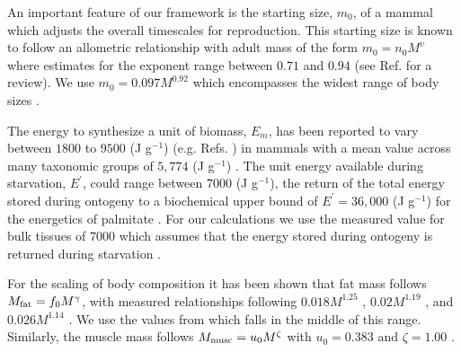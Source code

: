 \documentclass[twocolumn,preprintnumbers,amsmath,amssymb,superscriptaddress]{revtex4}
\begin{document}
An important feature of our framework is the starting size, $m_{0}$, of a mammal which adjusts the overall timescales for reproduction. This starting size is known to follow an allometric relationship with adult mass of the form $m_{0}=n_{0}M^{\upsilon}$ where estimates for the exponent range between $0.71$ and $0.94$ (see Ref. \citep{peters1986ecological} for a review). We use $m_{0}=0.097M^{0.92}$ \citep{blueweiss1978relationships} which encompasses the widest range of body sizes \citep{peters1986ecological}.

The energy to synthesize a unit of biomass, $E_{m}$, has been reported to vary between $1800$ to $9500$ (J g$^{-1}$) (e.g. Refs. \citep{West:2001bv,moses2008rmo,hou}) in mammals with a mean value across many taxonomic groups of $5,774$ (J g$^{-1}$) \citep{moses2008rmo}. The unit energy available during starvation, $E^{\prime}$, could range between $7000$ (J g$^{-1}$), the return of the total energy stored during ontogeny \citep{hou} to a biochemical upper bound of $E^{\prime}=36,000$ (J g$^{-1}$) for the energetics of palmitate \citep{stryer,hou}. For our calculations we use the measured value for bulk tissues of $7000$ which assumes that the energy stored during ontogeny is returned during starvation \citep{hou}.

For the scaling of body composition it has been shown that fat mass follows $M_{\rm fat}=f_{0}M^{\gamma}$, with measured  relationships following  $0.018M^{1.25}$ \citep{Dunbrack:1993ec}, $0.02M^{1.19}$ \citep{Lindstedt:1985hm}, and $0.026M^{1.14}$ \citep{Lindstedt:2002td}. We use the values from \citep{Lindstedt:1985hm} which falls in the middle of this range. Similarly, the muscle mass follows $M_{\rm musc}=u_{0}M^{\zeta}$ with $u_{0}=0.383$ and $\zeta=1.00$ \citep{Lindstedt:2002td}.

\end{document}
